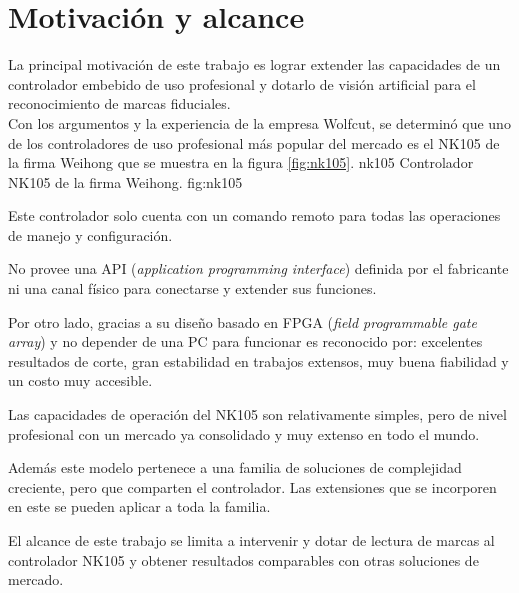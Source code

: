 \section{Motivación y alcance}
   La principal motivación de este trabajo es lograr extender las capacidades de un controlador embebido de uso profesional y dotarlo de visión artificial para el reconocimiento de marcas fiduciales. \\
   Con los argumentos y la experiencia de la empresa Wolfcut, se determinó que uno de los controladores de uso profesional más popular del mercado es el NK105 de la firma Weihong \citep{WEBSITE:nk105} que se muestra en la figura \ref{fig:nk105}.
      {nk105}
      {Controlador NK105 de la firma Weihong.}
      {fig:nk105}

   Este controlador solo cuenta con un comando remoto para todas las operaciones de manejo y configuración.\par
   No provee una API (\textit{application programming interface}) definida por el fabricante ni una canal físico para conectarse y extender sus funciones. \par
   Por otro lado, gracias a su diseño basado en FPGA (\textit{field programmable gate array}) y no depender de una PC para funcionar es reconocido por: excelentes resultados de corte, gran estabilidad en trabajos extensos, muy buena fiabilidad y un costo muy accesible. \par
   Las capacidades de operación del NK105 son relativamente simples, pero de nivel profesional con un mercado ya consolidado y muy extenso en todo el mundo.\par
   Además este modelo pertenece a una familia de soluciones de complejidad creciente, pero que comparten el controlador. Las extensiones que se incorporen en este se pueden aplicar a toda la familia.\par
   El alcance de este trabajo se limita a intervenir y dotar de lectura de marcas al controlador NK105 y obtener resultados comparables con otras soluciones de mercado.

